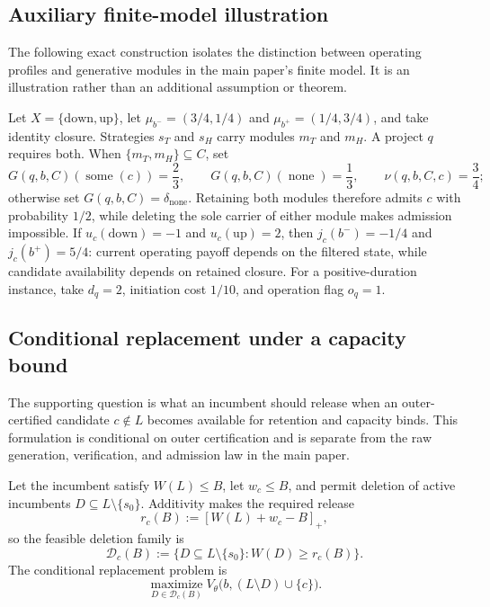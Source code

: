 \subsection{Auxiliary finite-model illustration}

The following exact construction isolates the distinction between operating
profiles and generative modules in the main paper's finite model.  It is an
illustration rather than an additional assumption or theorem.

\begin{example}\label{ex:modular-generator}
Let \(X=\{\mathrm{down},\mathrm{up}\}\), let
\(\mu_{b^-}=(3/4,1/4)\) and \(\mu_{b^+}=(1/4,3/4)\), and take identity
closure.  Strategies \(s_T\) and \(s_H\) carry modules \(m_T\) and \(m_H\).
A project \(q\) requires both.  When
\(\{m_T,m_H\}\subseteq C\), set
\[
  G(q,b,C)(\operatorname{some}(c))=\frac23,\qquad
  G(q,b,C)(\operatorname{none})=\frac13,\qquad
  \nu(q,b,C,c)=\frac34;
\]
otherwise set \(G(q,b,C)=\delta_{\operatorname{none}}\).  Retaining both
modules therefore admits \(c\) with probability \(1/2\), while deleting the
sole carrier of either module makes admission impossible.  If
\(u_c(\mathrm{down})=-1\) and \(u_c(\mathrm{up})=2\), then
\(j_c(b^-)=-1/4\) and \(j_c(b^+)=5/4\): current operating payoff depends on
the filtered state, while candidate availability depends on retained closure.
For a positive-duration instance, take \(d_q=2\), initiation cost \(1/10\),
and operation flag \(o_q=1\).
\end{example}

\subsection{Conditional replacement under a capacity bound}
\label{app:conditional-replacement}

The supporting question is what an incumbent should release when an
outer-certified candidate \(c\notin L\) becomes available for retention and
capacity binds.  This formulation is conditional on outer certification and
is separate from the raw generation, verification, and admission law in the
main paper.

Let the incumbent satisfy \(W(L)\le B\), let \(w_c\le B\), and permit deletion
of active incumbents \(D\subseteq L\setminus\{s_0\}\).  Additivity makes the
required release
\[
 r_c(B):=[W(L)+w_c-B]_+,
\]
so the feasible deletion family is
\[
 \mathcal D_c(B)
 :=\{D\subseteq L\setminus\{s_0\}:W(D)\ge r_c(B)\}.
\]
The conditional replacement problem is
\begin{equation}\label{eq:optional-replacement-problem}
 \operatorname*{maximize}_{D\in\mathcal D_c(B)}
 V_\theta\bigl(b,(L\setminus D)\cup\{c\}\bigr).
\end{equation}

